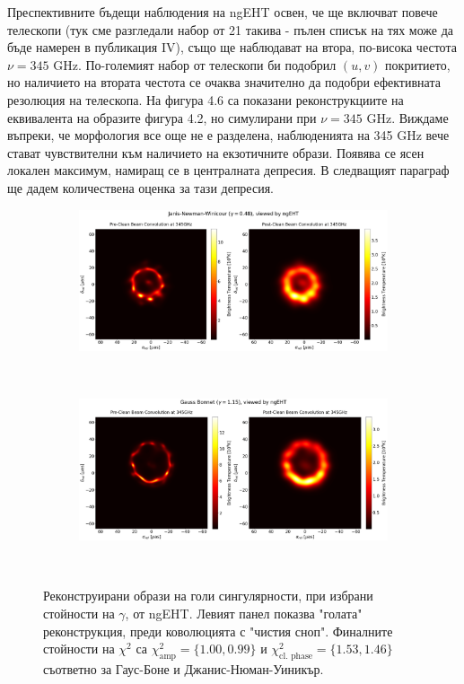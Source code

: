 \documentclass[12pt]{article}
\numberwithin{equation}{section}
\numberwithin{figure}{section}
\begin{document}
	Преспективните бъдещи наблюдения на ngEHT освен, че ще включват повече телескопи (тук сме разгледали набор от 21 такива - пълен списък на тях може да бъде намерен в публикация IV), също ще наблюдават на втора, по-висока честота $\nu = 345$ GHz. По-големият набор от телескопи би подобрил $(u,v)$ покритието, но наличието на втората честота се очаква значително да подобри ефективната резолюция на телескопа. На фигура 4.6 са показани реконструкциите на еквивалента на образите фигура 4.2, но симулирани при $\nu  =345$ GHz. Виждаме въпреки, че морфология все още не е разделена, наблюденията на 345 GHz вече стават чувствителни към наличието на екзотичните образи. Появява се ясен локален максимум, намиращ се в централната депресия. В следващият параграф ще дадем количествена оценка за тази депресия.
	
	\begin{figure}[h!]
		\centering
		\begin{subfigure}{12cm}
			\hspace{-1.5cm}
			\includegraphics[scale = 0.23]{Section_8_Observing_Horizonless_Objects/Ehtim_plot_ngEHT_no_blur_345_JNW.png}
		\end{subfigure}\\
		\begin{subfigure}{12cm}
			\hspace{-1.5cm}
			\includegraphics[scale = 0.23]{Section_8_Observing_Horizonless_Objects/Ehtim_plot_ngEHT_no_blur_345_GB.png}
		\end{subfigure}\\
		\label{Naked_Singularity_EHT_ng2017}
		\caption[Реконструирани образи на голи сингулярности, при избрани стойности на $\gamma$, от ngEHT]{\small Реконструирани образи на голи сингулярности, при избрани стойности на $\gamma$, от ngEHT. Левият панел показва "голата"$\,$ реконструкция, преди коволюцията с "чистия сноп". Финалните стойности на $\chi^2$ са $\chi^2_\text{amp} = \{1.00, 0.99\}$ и $\chi^2_\text{cl. phase} = \{1.53, 1.46\}$ съответно за Гаус-Боне и Джанис-Нюман-Уиникър.} 
	\end{figure}
	
\end{document}
